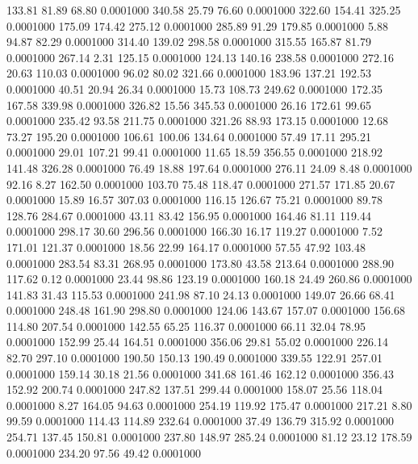  133.81   81.89   68.80   0.0001000
 340.58   25.79   76.60   0.0001000
 322.60  154.41  325.25   0.0001000
 175.09  174.42  275.12   0.0001000
 285.89   91.29  179.85   0.0001000
   5.88   94.87   82.29   0.0001000
 314.40  139.02  298.58   0.0001000
 315.55  165.87   81.79   0.0001000
 267.14    2.31  125.15   0.0001000
 124.13  140.16  238.58   0.0001000
 272.16   20.63  110.03   0.0001000
  96.02   80.02  321.66   0.0001000
 183.96  137.21  192.53   0.0001000
  40.51   20.94   26.34   0.0001000
  15.73  108.73  249.62   0.0001000
 172.35  167.58  339.98   0.0001000
 326.82   15.56  345.53   0.0001000
  26.16  172.61   99.65   0.0001000
 235.42   93.58  211.75   0.0001000
 321.26   88.93  173.15   0.0001000
  12.68   73.27  195.20   0.0001000
 106.61  100.06  134.64   0.0001000
  57.49   17.11  295.21   0.0001000
  29.01  107.21   99.41   0.0001000
  11.65   18.59  356.55   0.0001000
 218.92  141.48  326.28   0.0001000
  76.49   18.88  197.64   0.0001000
 276.11   24.09    8.48   0.0001000
  92.16    8.27  162.50   0.0001000
 103.70   75.48  118.47   0.0001000
 271.57  171.85   20.67   0.0001000
  15.89   16.57  307.03   0.0001000
 116.15  126.67   75.21   0.0001000
  89.78  128.76  284.67   0.0001000
  43.11   83.42  156.95   0.0001000
 164.46   81.11  119.44   0.0001000
 298.17   30.60  296.56   0.0001000
 166.30   16.17  119.27   0.0001000
   7.52  171.01  121.37   0.0001000
  18.56   22.99  164.17   0.0001000
  57.55   47.92  103.48   0.0001000
 283.54   83.31  268.95   0.0001000
 173.80   43.58  213.64   0.0001000
 288.90  117.62    0.12   0.0001000
  23.44   98.86  123.19   0.0001000
 160.18   24.49  260.86   0.0001000
 141.83   31.43  115.53   0.0001000
 241.98   87.10   24.13   0.0001000
 149.07   26.66   68.41   0.0001000
 248.48  161.90  298.80   0.0001000
 124.06  143.67  157.07   0.0001000
 156.68  114.80  207.54   0.0001000
 142.55   65.25  116.37   0.0001000
  66.11   32.04   78.95   0.0001000
 152.99   25.44  164.51   0.0001000
 356.06   29.81   55.02   0.0001000
 226.14   82.70  297.10   0.0001000
 190.50  150.13  190.49   0.0001000
 339.55  122.91  257.01   0.0001000
 159.14   30.18   21.56   0.0001000
 341.68  161.46  162.12   0.0001000
 356.43  152.92  200.74   0.0001000
 247.82  137.51  299.44   0.0001000
 158.07   25.56  118.04   0.0001000
   8.27  164.05   94.63   0.0001000
 254.19  119.92  175.47   0.0001000
 217.21    8.80   99.59   0.0001000
 114.43  114.89  232.64   0.0001000
  37.49  136.79  315.92   0.0001000
 254.71  137.45  150.81   0.0001000
 237.80  148.97  285.24   0.0001000
  81.12   23.12  178.59   0.0001000
 234.20   97.56   49.42   0.0001000
